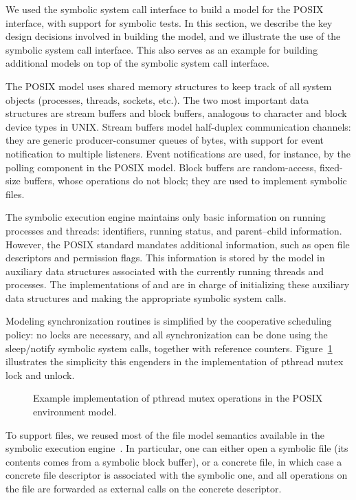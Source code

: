 We used the symbolic system call interface to build a model for the POSIX interface, with support for symbolic tests.
%
In this section, we describe the key design decisions involved in building the model, and we illustrate the use of the symbolic system call interface.
%
This also serves as an example for building additional models on top of the symbolic system call interface.

The POSIX model uses shared memory structures to keep track of all system objects (processes, threads, sockets, etc.).
%
The two most important data structures are stream buffers and block buffers, analogous to character and block device types in UNIX.  Stream buffers model half-duplex communication channels: they are generic producer-consumer queues of bytes, with support for event notification to multiple listeners.  Event notifications are used, for instance, by the polling component in the POSIX model.  Block buffers are random-access, fixed-size buffers, whose operations do not block; they are used to implement symbolic files.

The symbolic execution engine maintains only basic information on running processes and threads: identifiers, running status, and parent--child information.
%
However, the POSIX standard mandates additional information, such as open file descriptors and permission flags. This information is stored by the model in auxiliary data structures associated with the currently running threads and processes. The implementations of  and  are in charge of initializing these auxiliary data structures and making the appropriate symbolic system calls.

Modeling synchronization routines is simplified by the cooperative scheduling policy:
%
no locks are necessary, and all synchronization can be done using the sleep/notify symbolic system calls, together with reference counters.  Figure~\ref{fig:mutexcode} illustrates the simplicity this engenders in the implementation of pthread mutex lock and unlock.

\begin{figure}
  \centering
  \caption{Example implementation of pthread mutex operations in the POSIX environment model.}
  \label{fig:mutexcode}
\end{figure}

To support files, we reused most of the file model semantics available in the \klee symbolic execution engine~\cite{klee}.
%
In particular, one can either open a symbolic file (its contents comes from a symbolic block buffer), or a concrete file, in which case a concrete file descriptor is associated with the symbolic one, and all operations on the file are forwarded as external calls on the concrete descriptor. 

